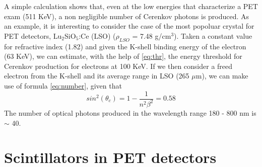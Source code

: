 A simple calculation shows that, even at the low energies that characterize a PET exam (511 KeV), a non negligible number of Cerenkov photons is produced.
As an example, it is interesting to consider the case of the most popoluar crystal for PET detectors, Lu$_{2}$SiO$_{5}$:Ce (LSO) ($\rho _{LSO}$ = 7.48 g/cm$^{3}$). Taken a constant value for refractive index (1.82\cite{jellison2012}) and given the K-shell binding energy of the electron (63 KeV\cite{xdata2009}), we can estimate, with the help of \ref{eq:thr}, the energy threshold for Cerenkov production for electrons at 100 KeV.
If we then consider a freed electron from the K-shell and its average range in LSO (265 $\mu$m\cite{nist2005}), we can make use of formula \ref{eq:number}, given that
\begin{equation}
sin ^{2}(\theta _{c}) = 1 - \frac{1}{n^{2}\beta ^{2}} = 0.58
\end{equation}
The number of optical photons produced in the wavelength range 180 - 800 nm is $\sim$ 40.


\section{Scintillators in PET detectors}



